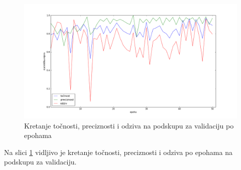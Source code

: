 \documentclass[times, utf8, diplomski, numeric]{fer}
\begin{document}
\begin{figure}[H]
\centering
\includegraphics[scale=0.35]{images/single_hand_scale1_acc_ap.png}
\caption{Kretanje točnosti, preciznosti i odziva na podskupu za validaciju po epohama}
\label{img:single_hand_scale1_acc_ap}
\end{figure}
\noindent Na slici \ref{img:single_hand_scale1_acc_ap} vidljivo je kretanje točnosti, preciznosti i odziva po epohama na podskupu za validaciju.
\end{document}
